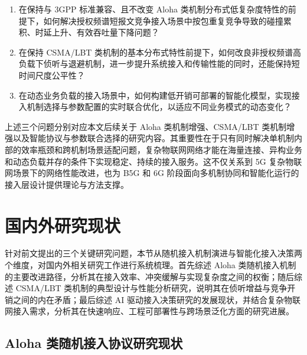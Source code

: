 \begin{enumerate}
	\item 在保持与 3GPP 标准兼容、且不改变 Aloha 类机制分布式低复杂度特性的前提下，如何解决授权频谱短报文竞争接入场景中按包重复竞争导致的碰撞累积、时延上升、有效吞吐量下降问题？

	\item 在保持 CSMA/LBT 类机制的基本分布式特性前提下，如何改良非授权频谱高负载下侦听与退避机制，进一步提升系统接入和传输性能的同时，还能保持短时间尺度公平性？

	\item 在动态业务负载的接入场景中，如何构建低开销可部署的智能化模型，实现接入机制选择与参数配置的实时联合优化，以适应不同业务模式的动态变化？
\end{enumerate}

上述三个问题分别对应本文后续关于 Aloha 类机制增强、CSMA/LBT 类机制增强以及智能协议与参数联合选择的研究内容。其重要性在于只有同时解决单机制内部的效率瓶颈和跨机制场景适配问题，复杂物联网网络才能在海量连接、异构业务和动态负载并存的条件下实现稳定、持续的接入服务。这不仅关系到 5G 复杂物联网场景下的网络性能改进，也为 B5G 和 6G 阶段面向多机制协同和智能化运行的接入层设计提供理论与方法支撑。


\section{国内外研究现状}
\label{sec:related_work}

针对前文提出的三个关键研究问题，本节从随机接入机制演进与智能化接入决策两个维度，对国内外相关研究工作进行系统梳理。首先综述 Aloha 类随机接入机制的主要改进路径，分析其在接入效率、冲突缓解与实现复杂度之间的权衡；随后综述 CSMA/LBT 类机制的典型设计与性能分析研究，说明其在侦听增益与竞争开销之间的内在矛盾；最后综述 AI 驱动接入决策研究的发展现状，并结合复杂物联网接入需求，分析其在快速响应、工程可部署性与跨场景泛化方面的研究进展。



\subsection{Aloha 类随机接入协议研究现状}
\label{subsec:related_mechanism}


